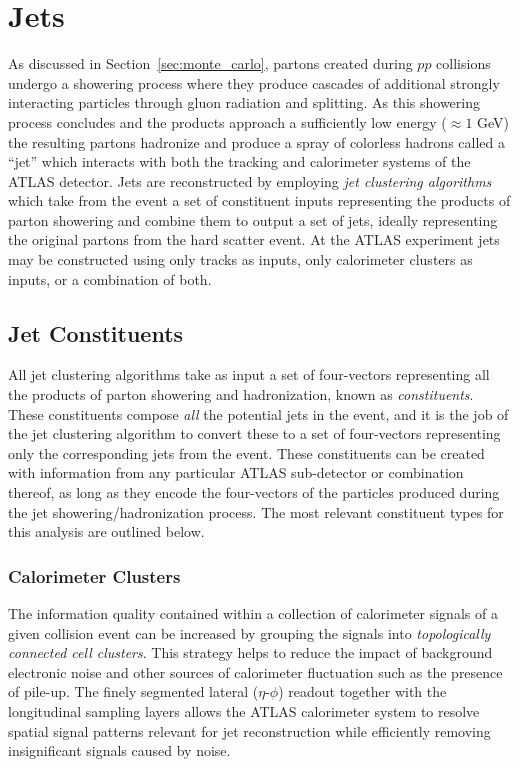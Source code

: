 \graphicspath{{Ch4_Jets/figures/}}

\chapter{Jets}
\label{ch:jets}
As discussed in Section~\ref{sec:monte_carlo}, partons created during $pp$ collisions undergo a showering process where they produce cascades of additional strongly interacting particles through gluon radiation and splitting.
As this showering process concludes and the products approach a sufficiently low energy ($\approx 1$ GeV) the resulting partons hadronize and produce a spray of colorless hadrons called a ``jet'' which interacts with both the tracking and calorimeter systems of the ATLAS detector.
Jets are reconstructed by employing \textit{jet clustering algorithms} which take from the event a set of constituent inputs representing the products of parton showering and combine them to output a set of jets, ideally representing the original partons from the hard scatter event.
At the ATLAS experiment jets may be constructed using only tracks as inputs, only calorimeter clusters as inputs, or a combination of both.

\section{Jet Constituents}
\label{sec:jet_constituents}
All jet clustering algorithms take as input a set of four-vectors representing all the products of parton showering and hadronization, known as \textit{constituents}.
These constituents compose \textit{all} the potential jets in the event, and it is the job of the jet clustering algorithm to convert these to a set of four-vectors representing only the corresponding jets from the event.
These constituents can be created with information from any particular ATLAS sub-detector or combination thereof, as long as they encode the four-vectors of the particles produced during the jet showering/hadronization process.
The most relevant constituent types for this analysis are outlined below.

\subsection{Calorimeter Clusters}
The information quality contained within a collection of calorimeter signals of a given collision event can be increased by grouping the signals into \textit{topologically connected cell clusters}.
This strategy helps to reduce the impact of background electronic noise and other sources of calorimeter fluctuation such as the presence of pile-up.
The finely segmented lateral ($\eta$-$\phi$) readout together with the longitudinal sampling layers allows the ATLAS calorimeter system to resolve spatial signal patterns relevant for jet reconstruction while efficiently removing insignificant signals caused by noise.

